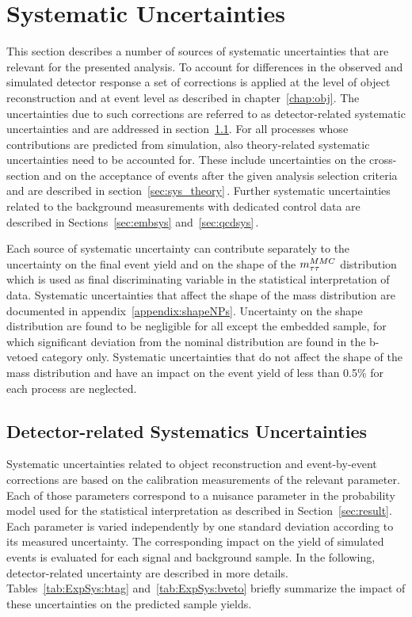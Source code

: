 \section{Systematic Uncertainties}
\label{sec:Systematics}

This section describes a number of sources of systematic uncertainties
that are relevant for the presented  analysis. To account for differences in the observed and simulated 
detector response a set of corrections is applied at the level of object reconstruction  
and at event level as described in chapter~\ref{chap:obj}. 
The uncertainties due to such corrections are referred to as detector-related systematic 
uncertainties and are addressed in section~\ref{sec:sys:sys_det}. 
For all processes whose contributions are predicted from simulation, also theory-related
systematic uncertainties need to be accounted for. These include uncertainties on the cross-section and
 on the acceptance of events after the given analysis selection criteria and 
are  described in section~\ref{sec:sys_theory}$\,.$
Further systematic uncertainties related to the background measurements with dedicated control data 
are described in Sections~\ref{sec:embsys} and~\ref{sec:qcdsys}$\,.$

Each source of systematic uncertainty can contribute separately to the uncertainty on the
final event yield and on the shape of the $m_{\tau\tau}^{MMC}$
distribution which is used as final discriminating variable in the statistical interpretation of data. Systematic uncertainties
that affect the shape of the mass distribution are
documented in appendix~\ref{appendix:shapeNPs}. Uncertainty on the \mmc shape distribution 
are found to be negligible for all except the embedded sample, for which significant 
deviation from the nominal distribution are found in the b-vetoed category only. 
Systematic uncertainties that do not affect the
shape of the mass distribution and have an impact on the event yield of less than 0.5\% for each process are 
neglected.


\subsection{Detector-related Systematics Uncertainties}
\label{sec:sys:sys_det}
Systematic uncertainties related to object reconstruction and event-by-event 
corrections are based on the calibration measurements of the relevant parameter. Each 
of those parameters correspond to a nuisance parameter in the probability model used for the  statistical interpretation
as described in Section~\ref{sec:result}.
Each parameter is varied independently by one standard deviation  according to its measured
uncertainty. The corresponding impact on the  yield of simulated events is evaluated for each signal and background sample.
In the following, detector-related uncertainty are  described in more details.
Tables~\ref{tab:ExpSys:btag} and~\ref{tab:ExpSys:bveto} briefly summarize the impact of these uncertainties on the 
predicted sample yields. 


